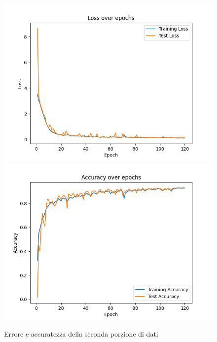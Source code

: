 \begin{figure}[!ht]
	\begin{adjustbox}{width=0.9\columnwidth, center}
    \includegraphics{./images/fold_1_loss.png} \includegraphics{./images/fold_1_accuracy.png}
  \end{adjustbox}
  \caption{Errore e accuratezza della seconda porzione di dati}
  \label{fig:loss e accuratezza della seconda porzione di dati}
\end{figure}


